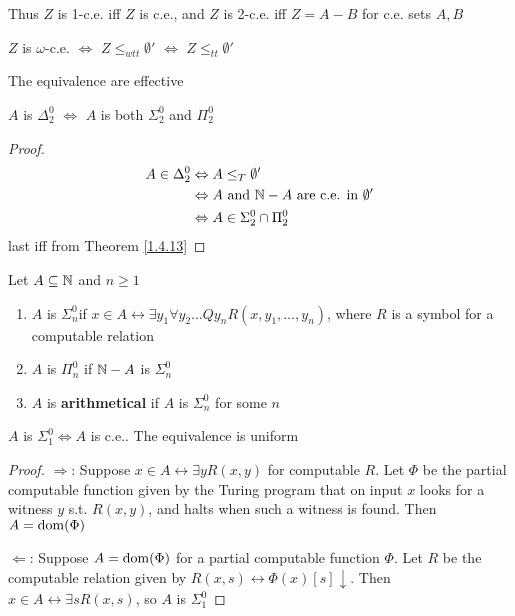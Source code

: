\documentclass[11pt]{article}
\begin{document}
Thus \(Z\) is 1-c.e. iff \(Z\) is c.e., and \(Z\)  is 2-c.e. iff \(Z=A-B\) for c.e. sets \(A,B\)

\begin{proposition}[]
\(Z\) is \(\omega\)-c.e. \(\Leftrightarrow\) \(Z\le_{wtt}\emptyset'\) \(\Leftrightarrow\) \(Z\le_{tt}\emptyset'\)

The equivalence are effective
\end{proposition}



\begin{corollary}[]
\(A\) is \(\Delta_2^0\) \(\Leftrightarrow\) \(A\) is both \(\Sigma_2^0\) and \(\Pi_2^0\)
\end{corollary}

\begin{proof}
\begin{align*}
A\in\Delta_2^0&\Leftrightarrow A\le_T\emptyset'\\
&\Leftrightarrow A\text{ and }\mathbb{N}-A\text{ are c.e. in }\emptyset'\\
&\Leftrightarrow A\in\Sigma_2^0\cap\Pi_2^0
\end{align*}
last iff from Theorem \ref{1.4.13}
\end{proof}


\begin{definition}[]
Let \(A\subseteq\mathbb{N}\) and \(n\ge 1\)
\begin{enumerate}
\item \(A\) is \(\Sigma_n^0\)if \(x\in A\leftrightarrow\exists y_1\forall y_2\dots Qy_nR(x,y_1,\dots,y_n)\), where \(R\) is a symbol for a
computable relation
\item \(A\) is \(\Pi_n^0\) if \(\mathbb{N}-A\) is \(\Sigma_n^0\)
\item \(A\) is \textbf{arithmetical} if \(A\) is \(\Sigma_n^0\) for some \(n\)
\end{enumerate}
\end{definition}

\begin{fact}[]
\label{1.4.12}
\(A\) is \(\Sigma_1^0\Leftrightarrow A\) is c.e.. The equivalence is uniform
\end{fact}

\begin{proof}
\(\Rightarrow\): Suppose \(x\in A\leftrightarrow\exists y R(x,y)\) for computable \(R\). Let \(\Phi\) be the partial computable
function given by the Turing program that on input \(x\) looks for a witness \(y\)
s.t. \(R(x,y)\), and halts when such a witness is found. Then \(A=\operatorname{dom}(\Phi)\)

\(\Leftarrow\): Suppose \(A=\operatorname{dom}(\Phi)\) for a partial computable function \(\Phi\). Let \(R\) be the computable
relation given by \(R(x,s)\leftrightarrow\Phi(x)[s]\downarrow\). Then \(x\in A\leftrightarrow\exists sR(x,s)\), so \(A\) is \(\Sigma_1^0\)
\end{proof}
\end{document}
